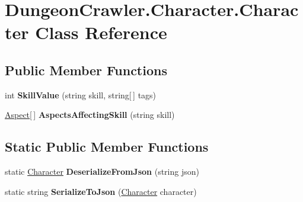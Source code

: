\hypertarget{class_dungeon_crawler_1_1_character_1_1_character}{}\section{Dungeon\+Crawler.\+Character.\+Character Class Reference}
\label{class_dungeon_crawler_1_1_character_1_1_character}
\subsection*{Public Member Functions}
\begin{DoxyCompactItemize}
\item 
\hypertarget{class_dungeon_crawler_1_1_character_1_1_character_ac7a76a986b94456d8bc1e11ce3ca1fb0}{}int {\bfseries Skill\+Value} (string skill, string\mbox{[}$\,$\mbox{]} tags)\label{class_dungeon_crawler_1_1_character_1_1_character_ac7a76a986b94456d8bc1e11ce3ca1fb0}

\item 
\hypertarget{class_dungeon_crawler_1_1_character_1_1_character_a11466af89a3a3568e67ccbdcd09459c0}{}\hyperlink{class_dungeon_crawler_1_1_core_1_1_aspect}{Aspect}\mbox{[}$\,$\mbox{]} {\bfseries Aspects\+Affecting\+Skill} (string skill)\label{class_dungeon_crawler_1_1_character_1_1_character_a11466af89a3a3568e67ccbdcd09459c0}

\end{DoxyCompactItemize}
\subsection*{Static Public Member Functions}
\begin{DoxyCompactItemize}
\item 
\hypertarget{class_dungeon_crawler_1_1_character_1_1_character_afa98f6089012bcc1077fbae13e6abfd5}{}static \hyperlink{class_dungeon_crawler_1_1_character_1_1_character}{Character} {\bfseries Deserialize\+From\+Json} (string json)\label{class_dungeon_crawler_1_1_character_1_1_character_afa98f6089012bcc1077fbae13e6abfd5}

\item 
\hypertarget{class_dungeon_crawler_1_1_character_1_1_character_a0e4ae66b1518972809a7e41a59b0be36}{}static string {\bfseries Serialize\+To\+Json} (\hyperlink{class_dungeon_crawler_1_1_character_1_1_character}{Character} character)\label{class_dungeon_crawler_1_1_character_1_1_character_a0e4ae66b1518972809a7e41a59b0be36}

\end{DoxyCompactItemize}
